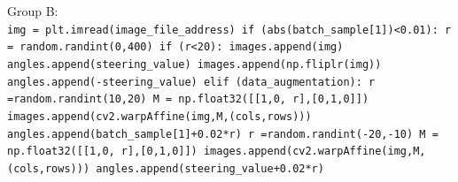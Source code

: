 \documentclass[12pt,a4paper]{article}
\begin{document}
		\noindent Group B:\\
		\texttt{img = plt.imread(image\_file\_address) \newline
		if (abs(batch\_sample[1])<0.01):\newline
		\hspace*{0.5cm} r = random.randint(0,400)\newline
		\hspace*{0.5cm} if (r<20):\newline
		\hspace*{1.0cm} images.append(img)\newline
		\hspace*{1.0cm} angles.append(steering\_value)\newline
		\hspace*{1.0cm} images.append(np.fliplr(img))\newline
		\hspace*{1.0cm} angles.append(-steering\_value)\newline
		\hspace*{0.5cm} elif (data\_augmentation):\newline
		\hspace*{1.0cm} r =random.randint(10,20)\newline
		\hspace*{1.0cm} M = np.float32([[1,0, r],[0,1,0]])\newline
		\hspace*{1.0cm} images.append(cv2.warpAffine(img,M,(cols,rows)))\newline
		\hspace*{1.0cm} angles.append(batch\_sample[1]+0.02*r)\newline
		\hspace*{1.0cm} r =random.randint(-20,-10)\newline
		\hspace*{1.0cm} M = np.float32([[1,0, r],[0,1,0]])\newline
		\hspace*{1.0cm} images.append(cv2.warpAffine(img,M,(cols,rows)))\newline
		\hspace*{1.0cm} angles.append(steering\_value+0.02*r)}
	

	
	
\end{document}
